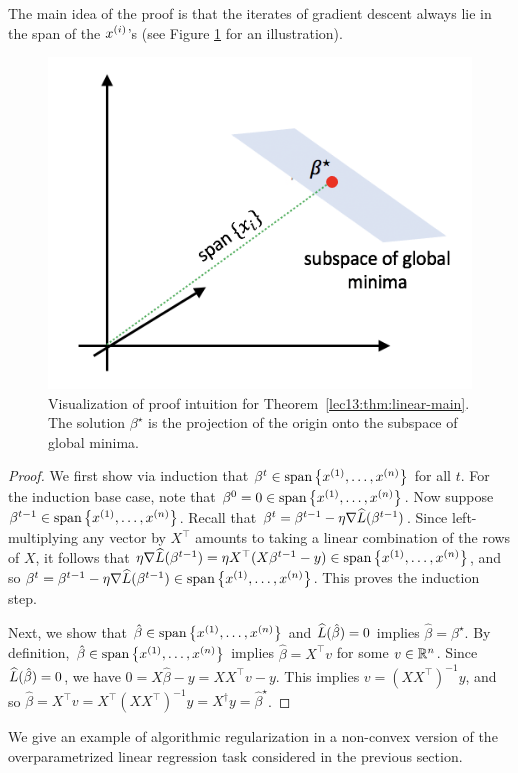 The main idea of the proof is that the iterates of gradient descent always lie in the span of the $x\sp{i}$'s (see Figure \ref{lec13:fig:1} for an illustration).

\begin{figure}
\centering
\includegraphics[width=.35\linewidth]{figures/subspace-global-min.png}
\caption{Visualization of proof intuition for Theorem~\ref{lec13:thm:linear-main}. The solution $\beta^\star$ is the projection of the origin onto the subspace of global minima.}
\label{lec13:fig:1}
\end{figure}

\begin{proof}
We first show via induction that $\beta^t \in \text{span}\l\{ x\sp{1}, \dots,x\sp{n} \r\}$ for all $t$. For the induction base case, note that $\beta^0 = 0 \in \text{span}\l\{ x\sp{1}, \dots,x\sp{n} \r\}$. Now suppose $\beta^{t-1} \in \text{span}\l\{ x\sp{1}, \dots,x\sp{n} \r\}$. Recall that $\beta^t = \beta^{t-1} - \eta \nabla \hatL(\beta^{t-1})$. Since left-multiplying any vector by $X^\top$ amounts to taking a linear combination of the rows of $X$, it follows that $\eta \nabla \hatL(\beta^{t-1}) = \eta X^\top(X\beta^{t-1} - y) \in \text{span}\l\{ x\sp{1}, \dots,x\sp{n} \r\}$, and so $\beta^t = \beta^{t-1} - \eta \nabla \hatL(\beta^{t-1}) \in \text{span}\l\{ x\sp{1}, \dots,x\sp{n} \r\}$. This proves the induction step.

Next, we show that $\hat \beta \in \text{span}\l\{ x\sp{1}, \dots,x\sp{n} \r\}$ and $\hatL(\hat \beta) = 0$ implies $\hat \beta = \beta^\star$. By definition, $\hat \beta \in \text{span}\l\{ x\sp{1}, \dots,x\sp{n} \r\}$ implies $\hat \beta = X^\top v$ for some $v \in \bbR^n$. Since $\hatL(\hat \beta) = 0$, we have $0 = X\hat \beta - y = X X^\top v - y$. This implies $v = (X X^\top)^{-1}y$, and so $\hat \beta = X^\top v = X^\top (X X^\top)^{-1} y = X^\dagger y = \hat \beta^\star$.
\end{proof}

We give an example of algorithmic regularization in a non-convex version of the overparametrized linear regression task considered in the previous section.

